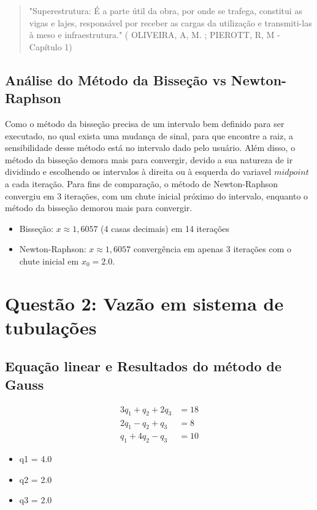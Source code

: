 \documentclass{article}
\begin{document}
\begin{quote}
"Superestrutura: É a parte útil da obra, por onde se trafega, constitui as vigas e lajes, responsável por receber as cargas da utilização e transmiti-las à meso e infraestrutura." ( OLIVEIRA, A, M. ; PIEROTT, R, M - Capítulo 1) \cite{oliveira2016}
\end{quote}

\subsection*{Análise do Método da Bisseção vs Newton-Raphson}
Como o método da bisseção precisa de um intervalo bem definido para ser executado, no qual exista uma mudança de sinal, para que encontre a raiz, a sensibilidade desse método está no intervalo dado pelo usuário. Além disso, o método da bisseção demora mais para convergir, devido a sua natureza
de ir dividindo e escolhendo os intervalos à direita ou à esquerda do variavel $midpoint$ a cada iteração. Para fins de comparação, o método de Newton-Raphson convergiu em 3 iterações, com um chute inicial próximo do intervalo, enquanto o método da bisseção demorou mais para convergir.
\begin{itemize}
\item Bisseção: $x \approx 1,\!6057$ (4 casas decimais) em 14 iterações 
\item Newton-Raphson: $x \approx 1,\!6057$ convergência em apenas 3 iterações com o chute inicial em $x_0 = 2.0$.
\end{itemize}



\section*{Questão 2: Vazão em sistema de tubulações}
\subsection*{Equação linear e Resultados do método de Gauss}
\begin{align*}
3q_1 + q_2 + 2q_3 &= 18 \\
2q_1 - q_2 + q_3 &= 8 \\
q_1 + 4q_2 - q_3 &= 10
\end{align*}

\begin{itemize}
\item q1 = 4.0
\item q2 = 2.0
\item q3 = 2.0
\end{itemize}
\end{document}
